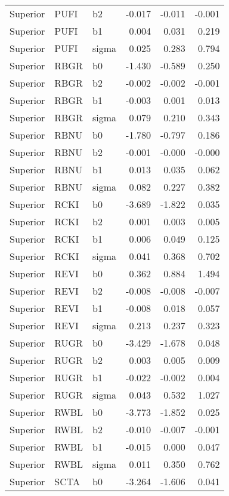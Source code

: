 \begin{table}[ht]
\begin{center}
\begin{tabular}{lllrrr}
  Superior & PUFI & b2 & -0.017 & -0.011 & -0.001 \\ 
  Superior & PUFI & b1 & 0.004 & 0.031 & 0.219 \\ 
  Superior & PUFI & sigma & 0.025 & 0.283 & 0.794 \\ 
  Superior & RBGR & b0 & -1.430 & -0.589 & 0.250 \\ 
  Superior & RBGR & b2 & -0.002 & -0.002 & -0.001 \\ 
  Superior & RBGR & b1 & -0.003 & 0.001 & 0.013 \\ 
  Superior & RBGR & sigma & 0.079 & 0.210 & 0.343 \\ 
  Superior & RBNU & b0 & -1.780 & -0.797 & 0.186 \\ 
  Superior & RBNU & b2 & -0.001 & -0.000 & -0.000 \\ 
  Superior & RBNU & b1 & 0.013 & 0.035 & 0.062 \\ 
  Superior & RBNU & sigma & 0.082 & 0.227 & 0.382 \\ 
  Superior & RCKI & b0 & -3.689 & -1.822 & 0.035 \\ 
  Superior & RCKI & b2 & 0.001 & 0.003 & 0.005 \\ 
  Superior & RCKI & b1 & 0.006 & 0.049 & 0.125 \\ 
  Superior & RCKI & sigma & 0.041 & 0.368 & 0.702 \\ 
  Superior & REVI & b0 & 0.362 & 0.884 & 1.494 \\ 
  Superior & REVI & b2 & -0.008 & -0.008 & -0.007 \\ 
  Superior & REVI & b1 & -0.008 & 0.018 & 0.057 \\ 
  Superior & REVI & sigma & 0.213 & 0.237 & 0.323 \\ 
  Superior & RUGR & b0 & -3.429 & -1.678 & 0.048 \\ 
  Superior & RUGR & b2 & 0.003 & 0.005 & 0.009 \\ 
  Superior & RUGR & b1 & -0.022 & -0.002 & 0.004 \\ 
  Superior & RUGR & sigma & 0.043 & 0.532 & 1.027 \\ 
  Superior & RWBL & b0 & -3.773 & -1.852 & 0.025 \\ 
  Superior & RWBL & b2 & -0.010 & -0.007 & -0.001 \\ 
  Superior & RWBL & b1 & -0.015 & 0.000 & 0.047 \\ 
  Superior & RWBL & sigma & 0.011 & 0.350 & 0.762 \\ 
  Superior & SCTA & b0 & -3.264 & -1.606 & 0.041 \\ 

\end{tabular}
\end{center}
\end{table}
